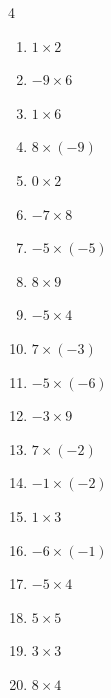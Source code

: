 \begin{multicols}{4}
\begin{enumerate}
  \item $1\times 2$
        \phantom{$=2$}

  \item $-9\times 6$
        \phantom{$=-54$}

  \item $1\times 6$
        \phantom{$=6$}

  \item $8\times (-9)$
        \phantom{$=-72$}

  \item $0\times 2$
        \phantom{$=0$}

  \item $-7\times 8$
        \phantom{$=-56$}

  \item $-5\times (-5)$
        \phantom{$=25$}

  \item $8\times 9$
        \phantom{$=72$}

  \item $-5\times 4$
        \phantom{$=-20$}

  \item $7\times (-3)$
        \phantom{$=-21$}

  \item $-5\times (-6)$
        \phantom{$=30$}

  \item $-3\times 9$
        \phantom{$=-27$}

  \item $7\times (-2)$
        \phantom{$=-14$}

\columnbreak %

\resetques

  \item $-1\times (-2)$
        \phantom{$=2$}

  \item $1\times 3$
        \phantom{$=3$}

  \item $-6\times (-1)$
        \phantom{$=6$}

  \item $-5\times 4$
        \phantom{$=-20$}

  \item $5\times 5$
        \phantom{$=25$}

  \item $3\times 3$
        \phantom{$=9$}

  \item $8\times 4$
        \phantom{$=32$}


\end{enumerate}
\end{multicols}
